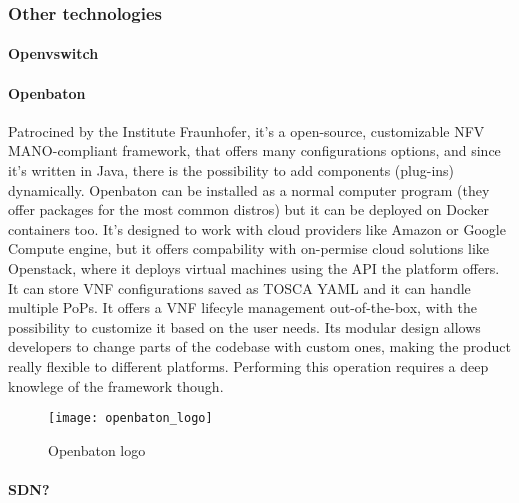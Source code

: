 




\subsubsection{Other technologies}
\paragraph{Openvswitch}
\paragraph{Openbaton} Patrocined by the Institute Fraunhofer, it's a 
open-source, customizable NFV MANO-compliant framework, that offers many
configurations options, and since it's written in Java, there is the possibility
to add components (plug-ins) dynamically. Openbaton can be installed as a normal
computer program (they offer packages for the most common distros) but it can be
deployed on Docker containers too. It's designed to work with cloud providers
like Amazon or Google Compute engine, but it offers compability with on-permise
cloud solutions like Openstack, where it deploys virtual machines using the API
the platform offers. It can store VNF configurations saved as TOSCA
YAML and it can handle multiple
PoPs. It offers a VNF lifecyle management
out-of-the-box, with the possibility to customize it based on the user needs.
Its modular design allows developers to change parts of the codebase with custom
ones, making the product really flexible to different platforms. Performing this
operation requires a deep knowlege of the framework though.
\begin{figure}[h]
 \centering \texttt{[image: openbaton\_logo]}
 \caption{Openbaton logo}
 \label{chap:prjan:img:openbaton_logo}
\end{figure}

\paragraph{SDN?}
